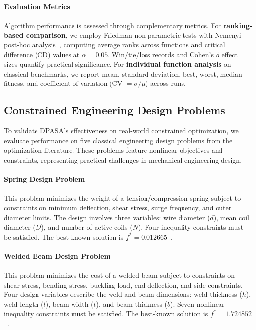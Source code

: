 \documentclass[11pt]{article}
\begin{document}
\paragraph{Evaluation Metrics}

Algorithm performance is assessed through complementary metrics. For \textbf{ranking-based comparison}, we employ Friedman non-parametric tests with Nemenyi post-hoc analysis~\citep{derrac2011practical}, computing average ranks across functions and critical difference (CD) values at $\alpha = 0.05$. Win/tie/loss records and Cohen's $d$ effect sizes quantify practical significance. For \textbf{individual function analysis} on classical benchmarks, we report mean, standard deviation, best, worst, median fitness, and coefficient of variation (CV $= \sigma / \mu$) across runs.

\subsection{Constrained Engineering Design Problems}
\label{sec:engineering_problems}

To validate DPASA's effectiveness on real-world constrained optimization, we evaluate performance on five classical engineering design problems from the optimization literature. These problems feature nonlinear objectives and constraints, representing practical challenges in mechanical engineering design.

\paragraph{Spring Design Problem} This problem minimizes the weight of a tension/compression spring subject to constraints on minimum deflection, shear stress, surge frequency, and outer diameter limits. The design involves three variables: wire diameter ($d$), mean coil diameter ($D$), and number of active coils ($N$). Four inequality constraints must be satisfied. The best-known solution is $f^* = 0.012665$~\citep{coello2000use}.

\paragraph{Welded Beam Design Problem} This problem minimizes the cost of a welded beam subject to constraints on shear stress, bending stress, buckling load, end deflection, and side constraints. Four design variables describe the weld and beam dimensions: weld thickness ($h$), weld length ($l$), beam width ($t$), and beam thickness ($b$). Seven nonlinear inequality constraints must be satisfied. The best-known solution is $f^* = 1.724852$~\citep{ragsdell1976optimal}.
\end{document}
